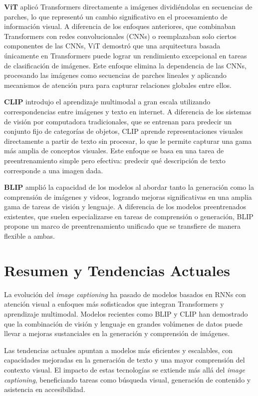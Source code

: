 \textbf{ViT} \cite{dosovitskiy2021image} aplicó Transformers directamente a imágenes dividiéndolas en secuencias de parches, lo que representó un cambio significativo en el procesamiento de información visual. A diferencia de los enfoques anteriores, que combinaban Transformers con redes convolucionales (CNNs) o reemplazaban solo ciertos componentes de las CNNs, ViT demostró que una arquitectura basada únicamente en Transformers puede lograr un rendimiento excepcional en tareas de clasificación de imágenes. Este enfoque elimina la dependencia de las CNNs, procesando las imágenes como secuencias de parches lineales y aplicando mecanismos de atención pura para capturar relaciones globales entre ellos.

\textbf{CLIP} \cite{radford2021learning} introdujo el aprendizaje multimodal a gran escala utilizando correspondencias entre imágenes y texto en internet. A diferencia de los sistemas de visión por computadora tradicionales, que se entrenan para predecir un conjunto fijo de categorías de objetos, CLIP aprende representaciones visuales directamente a partir de texto sin procesar, lo que le permite capturar una gama más amplia de conceptos visuales. Este enfoque se basa en una tarea de preentrenamiento simple pero efectiva: predecir qué descripción de texto corresponde a una imagen dada.

\textbf{BLIP} \cite{li2022blip} amplió la capacidad de los modelos al abordar tanto la generación como la comprensión de imágenes y videos, logrando mejoras significativas en una amplia gama de tareas de visión y lenguaje. A diferencia de los modelos preentrenados existentes, que suelen especializarse en tareas de comprensión o generación, BLIP propone un marco de preentrenamiento unificado que se transfiere de manera flexible a ambas. 

\section{Resumen y Tendencias Actuales}

La evolución del \textit{image captioning} ha pasado de modelos basados en RNNs con atención visual a enfoques más sofisticados que integran Transformers y aprendizaje multimodal. Modelos recientes como BLIP y CLIP han demostrado que la combinación de visión y lenguaje en grandes volúmenes de datos puede llevar a mejoras sustanciales en la generación y comprensión de imágenes. 

Las tendencias actuales apuntan a modelos más eficientes y escalables, con capacidades mejoradas en la generación de texto y una mayor comprensión del contexto visual. El impacto de estas tecnologías se extiende más allá del \textit{image captioning}, beneficiando tareas como búsqueda visual, generación de contenido y asistencia en accesibilidad.


